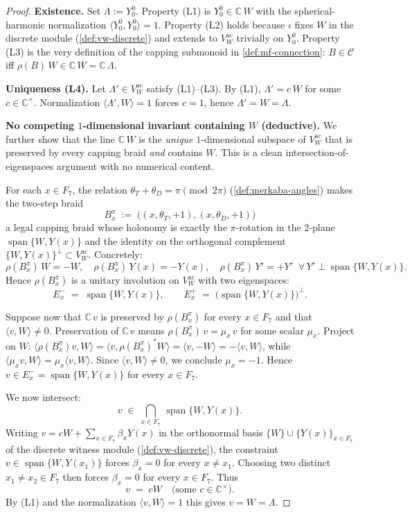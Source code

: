 \documentclass[11pt,a4paper]{article}
\theoremstyle{plain}
\theoremstyle{definition}
\theoremstyle{remark}
\numberwithin{equation}{section}
\newcommand{\Complex}{\mathbb{C}}
\DeclareMathOperator{\spn}{span}
\begin{document}
\begin{proof}
\textbf{Existence.}  Set $\Lambda:=Y_0^0$.  Property (L1) is
$Y_0^0\in\Complex\,W$ with the spherical-harmonic normalization
$\langle Y_0^0,Y_0^0\rangle=1$.  Property (L2) holds because $\iota$
fixes $W$ in the discrete module (\cref{def:vw-discrete}) and
extends to $V_W^{\mathrm{ac}}$ trivially on $Y_0^0$.  Property (L3)
is the very definition of the capping submonoid in
\cref{def:mf-connection}: $B\in\mathcal{C}$ iff
$\rho(B)\,W\in\Complex\,W=\Complex\,\Lambda$.

\smallskip
\textbf{Uniqueness (L4).}  Let $\Lambda'\in V_W^{\mathrm{ac}}$
satisfy (L1)--(L3).  By (L1), $\Lambda'=c\,W$ for some
$c\in\Complex^{\times}$.  Normalization
$\langle\Lambda',W\rangle=1$ forces $c=1$, hence $\Lambda'=W=
\Lambda$.

\smallskip
\textbf{No competing $1$-dimensional invariant containing $W$
(deductive).}  We further show that the line $\Complex\,W$ is
the \emph{unique} $1$-dimensional subspace of $V_W^{\mathrm{ac}}$
that is preserved by every capping braid \emph{and} contains
$W$.  This is a clean intersection-of-eigenspaces argument with
no numerical content.

For each $x\in F_7$, the relation
$\theta_T+\theta_D=\pi\pmod{2\pi}$ (\cref{def:merkaba-angles})
makes the two-step braid
\[
  B_x^{\pi}\;:=\;\bigl((x,\theta_T,+1),(x,\theta_D,+1)\bigr)
\]
a legal capping braid whose holonomy is exactly the
$\pi$-rotation in the $2$-plane $\spn\{W,Y(x)\}$ and the
identity on the orthogonal complement
$\{W,Y(x)\}^{\perp}\subset V_W^{\mathrm{ac}}$.  Concretely:
\[
  \rho(B_x^{\pi})\,W=-W,\quad
  \rho(B_x^{\pi})\,Y(x)=-Y(x),\quad
  \rho(B_x^{\pi})\,Y'=+Y'
  \;\;\forall\,Y'\perp\spn\{W,Y(x)\}.
\]
Hence $\rho(B_x^{\pi})$ is a unitary involution on
$V_W^{\mathrm{ac}}$ with two eigenspaces:
\[
  E_x^{-}\;=\;\spn\{W,Y(x)\},\qquad
  E_x^{+}\;=\;\bigl(\spn\{W,Y(x)\}\bigr)^{\perp}.
\]

Suppose now that $\Complex\,v$ is preserved by $\rho(B_x^{\pi})$
for every $x\in F_7$ and that $\langle v,W\rangle\ne 0$.
Preservation of $\Complex\,v$ means
$\rho(B_x^{\pi})\,v=\mu_x\,v$ for some scalar $\mu_x$.  Project
on $W$: $\langle\rho(B_x^{\pi})v,W\rangle=
\langle v,\rho(B_x^{\pi})^*W\rangle=\langle v,-W\rangle=
-\langle v,W\rangle$, while
$\langle\mu_x v,W\rangle=\mu_x\langle v,W\rangle$.  Since
$\langle v,W\rangle\ne 0$, we conclude $\mu_x=-1$.  Hence $v\in
E_x^{-}=\spn\{W,Y(x)\}$ for every $x\in F_7$.

We now intersect:
\[
  v\;\in\;\bigcap_{x\in F_7}\,\spn\{W,Y(x)\}.
\]
Writing $v=cW+\sum_{x\in F_7}\beta_x Y(x)$ in the orthonormal
basis $\{W\}\cup\{Y(x)\}_{x\in F_7}$ of the discrete witness
module (\cref{def:vw-discrete}),
the constraint $v\in\spn\{W,Y(x_1)\}$ forces
$\beta_x=0$ for every $x\ne x_1$.  Choosing two distinct
$x_1\ne x_2\in F_7$ then forces $\beta_x=0$ for every $x\in F_7$.
Thus
\[
  v\;=\;cW\quad\text{(some }c\in\Complex^{\times}\text{).}
\]
By (L1) and the normalization $\langle v,W\rangle=1$ this gives
$v=W=\Lambda$.


\end{proof}
\end{document}
